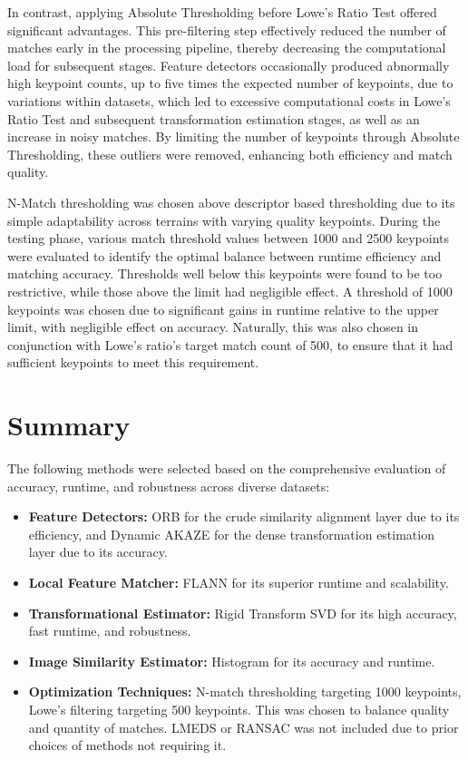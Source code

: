 In contrast, applying Absolute Thresholding before Lowe's Ratio Test offered significant advantages. This pre-filtering step effectively reduced the number of matches early in the processing pipeline, thereby decreasing the computational load for subsequent stages. Feature detectors occasionally produced abnormally high keypoint counts, up to five times the expected number of keypoints, due to variations within datasets, which led to excessive computational costs in Lowe's Ratio Test and subsequent transformation estimation stages, as well as an increase in noisy matches. By limiting the number of keypoints through Absolute Thresholding, these outliers were removed, enhancing both efficiency and match quality.

N-Match thresholding was chosen above descriptor based thresholding due to its simple adaptability across terrains with varying quality keypoints. During the testing phase, various match threshold values between 1000 and 2500 keypoints were evaluated to identify the optimal balance between runtime efficiency and matching accuracy. Thresholds well below this keypoints were found to be too restrictive, while those above the limit had negligible effect. A threshold of 1000 keypoints was chosen due to significant gains in runtime relative to the upper limit, with negligible effect on accuracy. Naturally, this was also chosen in conjunction with Lowe's ratio's target match count of 500, to ensure that it had sufficient keypoints to meet this requirement. 



\section{Summary}
The following methods were selected based on the comprehensive evaluation of accuracy, runtime, and robustness across diverse datasets:

\begin{itemize}
    \item \textbf{Feature Detectors:} ORB for the crude similarity alignment layer due to its efficiency, and Dynamic AKAZE for the dense transformation estimation layer due to its accuracy. 
    \item \textbf{Local Feature Matcher:} FLANN for its superior runtime and scalability.
    \item \textbf{Transformational Estimator:} Rigid Transform SVD for its high accuracy, fast runtime, and robustness.
    \item \textbf{Image Similarity Estimator:} Histogram for its accuracy and runtime.
    \item \textbf{Optimization Techniques:} N-match thresholding targeting 1000 keypoints, Lowe's filtering targeting 500 keypoints. This was chosen to balance quality and quantity of matches. LMEDS or RANSAC was not included due to prior choices of methods not requiring it.
\end{itemize}